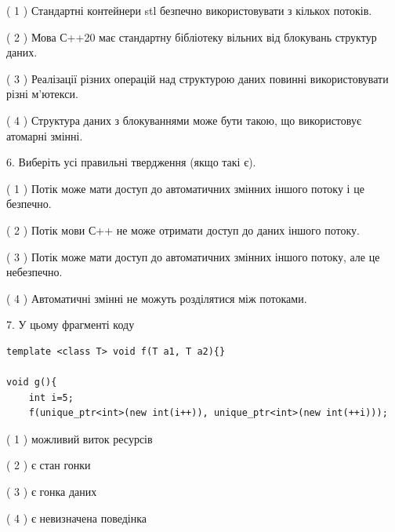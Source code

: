 \documentclass[12pt, ukrainian]{article}
\begin{document}
\begin {large}
{( 1 ) Стандартні контейнери stl безпечно використовувати з кількох потоків.%

( 2 ) Мова С++20 має стандартну бібліотеку вільних від блокувань структур даних.%

( 3 ) Реалізації різних операцій над структурою даних повинні використовувати різні м’ютекси.%

( 4 ) Структура даних з блокуваннями може бути такою, що використовує атомарні змінні.%
\newpage



\vspace{5mm}
6. Виберіть усі правильні твердження (якщо такі є).\par
\vspace{2mm}

( 1 ) Потік може мати доступ до автоматичних змінних іншого потоку і це безпечно.%

( 2 ) Потік мови С++ не може отримати доступ до даних іншого потоку.%

( 3 ) Потік може мати доступ до автоматичних змінних іншого потоку, але це небезпечно.%

( 4 ) Автоматичні змінні не можуть розділятися між потоками.%


\vspace{5mm}
7. У цьому фрагменті коду
\begin{verbatim}
template <class T> void f(T a1, T a2){}

void g(){
    int i=5;
    f(unique_ptr<int>(new int(i++)), unique_ptr<int>(new int(++i)));
\end{verbatim}

( 1 ) можливий виток ресурсів%

( 2 ) є стан гонки%

( 3 ) є гонка даних%

( 4 ) є невизначена поведінка%
}
\end {large}
\end{document}
